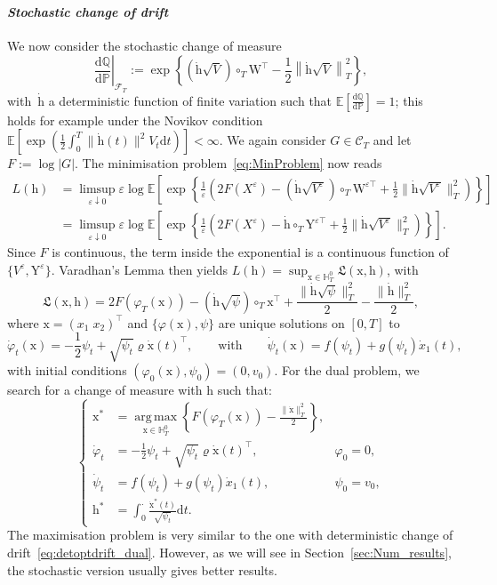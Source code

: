 \documentclass{amsart}[11pt]
\numberwithin{equation}{section}
\numberwithin{theorem}{subsection}
\numberwithin{proposition}{subsection}
\numberwithin{definition}{subsection}
\numberwithin{lemma}{subsection}
\numberwithin{assumption}{subsection}
\newcommand{\Cc}{\mathcal{C}}
\newcommand{\Ff}{\mathcal{F}}
\newcommand{\HH}{\mathbb{H}}
\newcommand{\PP}{\mathbb{P}}
\newcommand{\QQ}{\mathbb{Q}}
\newcommand{\Lf}{\mathfrak{L}}
\newcommand{\EE}{\mathbb{E}}
\newcommand{\cT}{\circ_{T}}
\newcommand{\Wf}{\boldsymbol{\mathrm{W}}}
\newcommand{\Yf}{\boldsymbol{\mathrm{Y}}}
\newcommand{\vrho}{\boldsymbol{\mathrm{\varrho}}}
\newcommand{\D}{\mathrm{d}}
\newcommand{\eps}{\varepsilon}
\newcommand{\hh}{\boldsymbol{\mathrm{h}}}
\newcommand{\xx}{\boldsymbol{\mathrm{x}}}
\DeclareMathOperator*{\argmax}{arg\,max}
\begin{document}
\paragraph{\textit{Stochastic change of drift}}
We now consider the stochastic change of measure 
$$
\left.\frac{\D\QQ}{\D\PP}\right|_{\Ff_T} := \exp\left\{\left(\dot{\hh}\sqrt{V}\right)\cT \Wf^\top - \frac{1}{2}\left\|\dot{\hh}\sqrt{V}\right\|_{T}^2\right\},
$$
with~$\dot{\hh}$ a deterministic function of finite variation such that $\EE[\frac{\D\QQ}{\D \PP}]=1$;
this holds for example under the Novikov condition $\EE\left [\exp(\frac{1}{2}\int_0^T \|\dot{\hh}(t)\|^2 V_t \D t)\right ]<\infty$. 
We again consider $G\in\Cc_T$ and let $F:=\log|G|$. 
The minimisation problem~\eqref{eq:MinProblem} now reads
\begin{align*}
L(\hh) &=\limsup\limits_{\eps\downarrow 0}\eps
\log\EE\left[\exp\left\{\frac{1}{\eps}\left(2F(X^{\eps}) - (\dot{\hh}\sqrt{V^{\eps}}) \cT \Wf^{\eps\top} + \frac{1}{2}\|\dot{\hh}\sqrt{V^\eps}\|_{T}^2\right)\right\}\right]\\
&= \limsup\limits_{\eps\downarrow 0}\eps\log\EE\left[\exp\left\{\frac{1}{\eps}\left(2F(X^{\eps}) - \dot{\hh} \cT \Yf^{\eps\top} + \frac{1}{2}\|\dot{\hh}\sqrt{V^\eps}\|_{T}^2\right)\right\}\right].
\end{align*}
Since $F$ is continuous, the term inside the exponential is a continuous function of $\{V^{\eps},\Yf^{\eps}\}$. 
Varadhan's Lemma then yields
$L(\hh) = \sup_{\xx\in \HH_T^0}\Lf(\xx,\hh)$,
with 
$$
\Lf(\xx,\hh) = 2F(\varphi_T(\xx)) - \left(\dot{\hh}\sqrt{\psi}\right)\cT \xx^\top + \frac{\|\dot{\hh}\sqrt{\psi}\|_{T}^2}{2} - \frac{\|\dot{\hh}\|_{T}^2}{2},
$$
where $\xx = (x_1 \; x_2)^\top$ and $\{\varphi(\xx),\psi\}$ are unique solutions on $[0,T]$ to
$$
\dot{\varphi}_t(\xx) = -\frac{1}{2}\psi_t + \sqrt{\psi_t} \vrho\dot{\xx}(t)^\top,
\qquad\text{with}\qquad
\dot{\psi}_t(\xx) = f(\psi_t) + g(\psi_t) \dot{x}_1(t),
$$
with initial conditions $(\varphi_0(\xx),\psi_0) = (0,v_0)$. 
For  the dual problem, we search for a change of measure with $\hh$ such that:
\begin{equation}\label{eq:detoptstochdrift_dual}
\left\{
\begin{array}{rll}
\xx^* & = \displaystyle \argmax\limits_{\xx\in \HH_T^0} 
\left\{F(\varphi_T(\xx)) - \frac{\|\dot{\xx}\|_{T}^2}{2}\right\},\\
\dot{\varphi}_t & = \displaystyle -\frac{1}{2}\psi_t + \sqrt{\psi_t} \vrho \dot{\xx}(t)^\top, & \varphi_0 = 0,\\
\dot{\psi}_t & = \displaystyle f(\psi_t) + g(\psi_t) \dot{x}_1(t), & \psi_0 = v_0,\\
\hh^* & = \displaystyle \int_{0}^{\cdot}\frac{\dot{\xx}^*(t)}{\sqrt{\psi_t}}\D t.
\end{array}
\right.
\end{equation}
The maximisation problem is very similar to the one with deterministic change of drift~\eqref{eq:detoptdrift_dual}. 
However, as we will see in Section~\ref{sec:Num_results}, the stochastic version usually gives better results.
\end{document}
